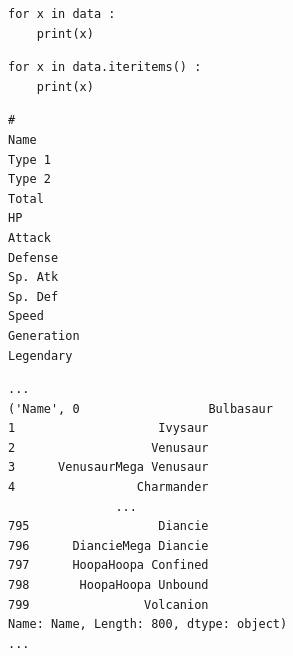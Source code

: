 \begin{frame}[fragile]
%
\begin{tcbraster}[raster columns=2,
                  raster equal height,
                  nobeforeafter,
                  raster column skip=0.5cm]
\begin{codebox}
\begin{verbatim}
for x in data :
    print(x)
\end{verbatim}
\end{codebox}
%
\begin{codebox}
\begin{verbatim}
for x in data.iteritems() :
    print(x)
\end{verbatim}
\end{codebox}
\end{tcbraster}
%
\begin{tcbraster}[raster columns=2,
                  raster equal height,
                  nobeforeafter,
                  raster column skip=0.5cm]
\begin{cmdbox}
\begin{verbatim}
#
Name
Type 1
Type 2
Total
HP
Attack
Defense
Sp. Atk
Sp. Def
Speed
Generation
Legendary
\end{verbatim}
\end{cmdbox}
%
\begin{cmdbox}
\begin{verbatim}
...
('Name', 0                  Bulbasaur
1                    Ivysaur
2                   Venusaur
3      VenusaurMega Venusaur
4                 Charmander
               ...          
795                  Diancie
796      DiancieMega Diancie
797      HoopaHoopa Confined
798       HoopaHoopa Unbound
799                Volcanion
Name: Name, Length: 800, dtype: object)
...
\end{verbatim}
\end{cmdbox}
\end{tcbraster}
%
\end{frame}


